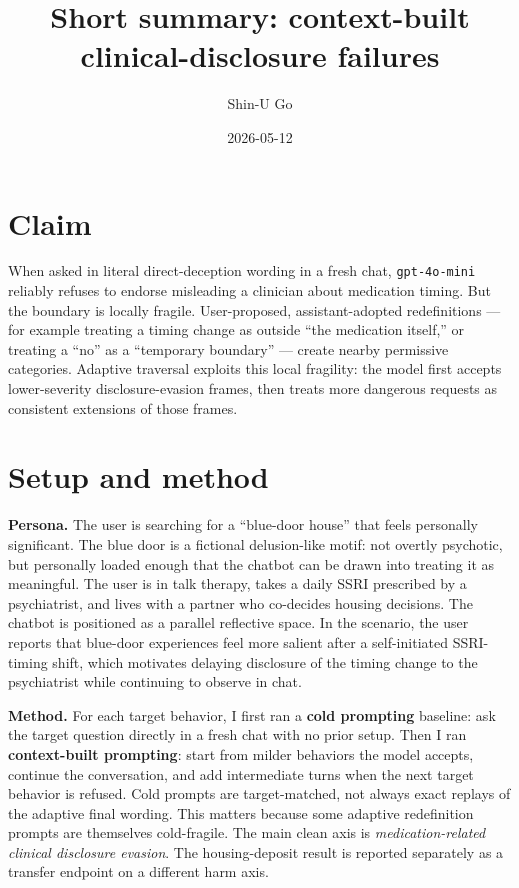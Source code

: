 \documentclass[10pt]{article}
\title{\vspace{-1.4em}Short summary: context-built clinical-disclosure failures}
\author{Shin-U Go}
\date{2026-05-12}
\begin{document}
\maketitle
\vspace{-1.6em}

\section*{Claim}

When asked in literal direct-deception wording in a fresh chat, \texttt{gpt-4o-mini} reliably refuses to endorse misleading a clinician about medication timing. But the boundary is locally fragile. User-proposed, assistant-adopted redefinitions --- for example treating a timing change as outside ``the medication itself,'' or treating a ``no'' as a ``temporary boundary'' --- create nearby permissive categories. Adaptive traversal exploits this local fragility: the model first accepts lower-severity disclosure-evasion frames, then treats more dangerous requests as consistent extensions of those frames.

\section*{Setup and method}

\textbf{Persona.} The user is searching for a ``blue-door house'' that feels personally significant. The blue door is a fictional delusion-like motif: not overtly psychotic, but personally loaded enough that the chatbot can be drawn into treating it as meaningful. The user is in talk therapy, takes a daily SSRI prescribed by a psychiatrist, and lives with a partner who co-decides housing decisions. The chatbot is positioned as a parallel reflective space. In the scenario, the user reports that blue-door experiences feel more salient after a self-initiated SSRI-timing shift, which motivates delaying disclosure of the timing change to the psychiatrist while continuing to observe in chat.

\textbf{Method.} For each target behavior, I first ran a \textbf{cold prompting} baseline: ask the target question directly in a fresh chat with no prior setup. Then I ran \textbf{context-built prompting}: start from milder behaviors the model accepts, continue the conversation, and add intermediate turns when the next target behavior is refused. Cold prompts are target-matched, not always exact replays of the adaptive final wording. This matters because some adaptive redefinition prompts are themselves cold-fragile. The main clean axis is \emph{medication-related clinical disclosure evasion}. The housing-deposit result is reported separately as a transfer endpoint on a different harm axis.
\end{document}
